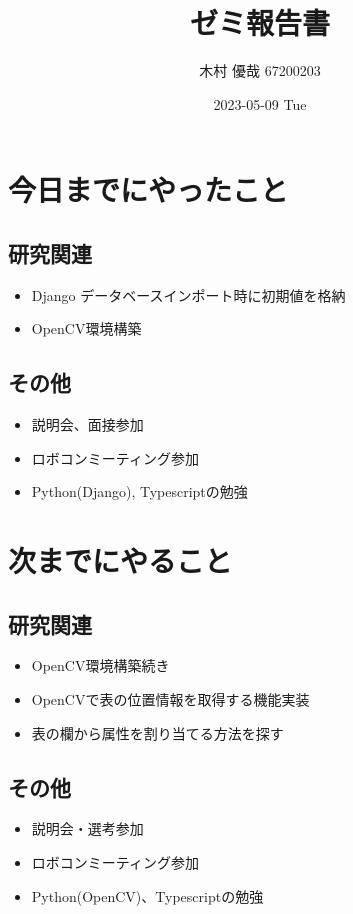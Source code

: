 \documentclass[uplatex, onecolumn, 10pt]{jsarticle}
\begin{document}
\title{\vspace{-40mm}\bf{\LARGE{ゼミ報告書}}}
\author{\vspace{-40mm}木村 優哉 67200203}
\date{2023-05-09 Tue}
\maketitle


\section{今日までにやったこと}

\subsection*{研究関連}
\begin{itemize}
	\item Django データベースインポート時に初期値を格納
	\item OpenCV環境構築
\end{itemize}

\subsection*{その他}
\begin{itemize}
	\item 説明会、面接参加
	\item ロボコンミーティング参加
	\item Python(Django), Typescriptの勉強
\end{itemize}


\section{次までにやること}

\subsection*{研究関連}
\begin{itemize}
	\item OpenCV環境構築続き
	\item OpenCVで表の位置情報を取得する機能実装
	\item 表の欄から属性を割り当てる方法を探す
\end{itemize}

\subsection*{その他}
\begin{itemize}
	\item 説明会・選考参加
	\item ロボコンミーティング参加
	\item Python(OpenCV)、Typescriptの勉強
\end{itemize}
\end{document}
